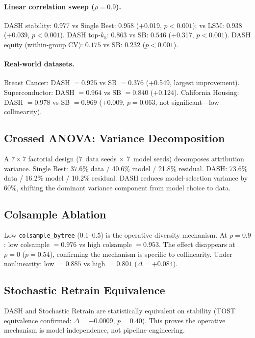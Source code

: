 \documentclass[11pt,a4paper]{article}
\begin{document}
\paragraph{Linear correlation sweep ($\rho = 0.9$).}
DASH stability: $0.977$ vs Single Best: $0.958$ (+0.019, $p < 0.001$); vs LSM: $0.938$ (+0.039, $p < 0.001$).  DASH top-$k_5$: $0.863$ vs SB: $0.546$ (+0.317, $p < 0.001$).  DASH equity (within-group CV): $0.175$ vs SB: $0.232$ ($p < 0.001$).

\paragraph{Real-world datasets.}
Breast Cancer: DASH $= 0.925$ vs SB $= 0.376$ (+0.549, largest improvement).  Superconductor: DASH $= 0.964$ vs SB $= 0.840$ (+0.124).  California Housing: DASH $= 0.978$ vs SB $= 0.969$ (+0.009, $p = 0.063$, not significant---low collinearity).

\subsection{Crossed ANOVA: Variance Decomposition}

A $7 \times 7$ factorial design (7~data seeds $\times$ 7~model seeds) decomposes attribution variance.  Single Best: 37.6\% data / 40.6\% model / 21.8\% residual.  DASH: 73.6\% data / 16.2\% model / 10.2\% residual.  DASH reduces model-selection variance by 60\%, shifting the dominant variance component from model choice to data.

\subsection{Colsample Ablation}

Low \texttt{colsample\_bytree} (0.1--0.5) is the operative diversity mechanism.  At $\rho = 0.9$: low colsample $= 0.976$ vs high colsample $= 0.953$.  The effect disappears at $\rho = 0$ ($p = 0.54$), confirming the mechanism is specific to collinearity.  Under nonlinearity: low $= 0.885$ vs high $= 0.801$ ($\Delta = +0.084$).

\subsection{Stochastic Retrain Equivalence}

DASH and Stochastic Retrain are statistically equivalent on stability (TOST equivalence confirmed: $\Delta = -0.0009$, $p = 0.40$).  This proves the operative mechanism is model independence, not pipeline engineering.
\end{document}
